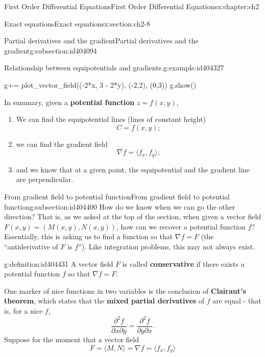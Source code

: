 \documentclass[oneside,10pt,]{book}
\newcommand{\terminology}[1]{\textbf{#1}}
\numberwithin{equation}{section}
\numberwithin{equation}{section}
\begin{document}
\begin{chapterptx}{First Order Differential Equations}{}{First Order Differential Equations}{}{}{x:chapter:ch2}
\begin{sectionptx}{Exact equations}{}{Exact equations}{}{}{x:section:ch2-8}
\begin{subsectionptx}{Partial derivatives and the gradient}{}{Partial derivatives and the gradient}{}{}{g:subsection:id404094}
\begin{example}{Relationship between equipotentials and gradients.}{g:example:id404327}
\begin{sageinput}
g+= plot_vector_field((-2*x, 3 - 2*y), (-2,2), (0,3))
g.show()
\end{sageinput}
\end{example}
In summary, given a \terminology{potential function} \(z = f(x,y)\),%
\begin{enumerate}
\item{}We can find the equipotential lines (lines of constant height)%
\begin{equation*}
C = f(x,y);
\end{equation*}
%
\item{}we can find the gradient field%
\begin{equation*}
\nabla f = \langle f_x, f_y \rangle;
\end{equation*}
%
\item{}and we know that at a given point, the equipotential and the gradient line are perpendicular.%
\end{enumerate}
%
\end{subsectionptx}
%
%
\typeout{************************************************}
\typeout{************************************************}
%
\begin{subsectionptx}{From gradient field to potential function}{}{From gradient field to potential function}{}{}{g:subsection:id404400}
How do we know when we can go the other direction? That is, as we asked at the top of the section, when given a vector field \(F(x,y) = (M(x,y), N(x,y))\), how can we recover a potential function \(f\)? Essentially, this is asking us to find a function so that \(\nabla f = F\) (the ``antiderivative of \(F\) is \(f\)''). Like integration problems, this may not always exist.%
\begin{definition}{}{g:definition:id404431}%
A vector field \(F\) is called \terminology{conservative} if there exists a potential function \(f\) so that \(\nabla f = F\).%
\end{definition}
One marker of nice functions in two variables is the conclusion of \terminology{Clairaut's theorem}, which states that the \terminology{mixed partial derivatives} of \(f\) are equal - that is, for a nice \(f\),%
\begin{equation*}
\frac{\partial^2 f}{\partial x \partial y} = \frac{\partial^2 f}{\partial y \partial x}.
\end{equation*}
Suppose for the moment that a vector field%
\begin{equation*}
F = \langle M, N \rangle = \nabla f = \langle f_x, f_y \rangle

\end{equation*}
\end{subsectionptx}
\end{sectionptx}
\end{chapterptx}
\end{document}
